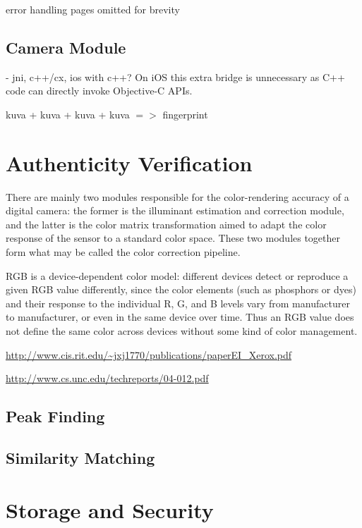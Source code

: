 \documentclass[thesis.tex]{subfiles}
\begin{document}
error handling pages omitted for brevity

\subsection{Camera Module}
- jni, c++/cx, ios with c++?
 On iOS this extra bridge is unnecessary as C++ code can directly invoke Objective-C APIs.

kuva + kuva + kuva + kuva $=>$ fingerprint

\section{Authenticity Verification}

\begin{comment}
\subsection{Color calibration}
\end{comment}
There are mainly two modules responsible for the color-rendering accuracy of a digital camera: the former is the illuminant estimation and correction module, and the latter is the color matrix transformation aimed to adapt the color response of the sensor to a standard color space. These two modules together form what may be called the color correction pipeline.

RGB is a device-dependent color model: different devices detect or reproduce a given RGB value differently, since the color elements (such as phosphors or dyes) and their response to the individual R, G, and B levels vary from manufacturer to manufacturer, or even in the same device over time. Thus an RGB value does not define the same color across devices without some kind of color management.

\url{http://www.cis.rit.edu/~jxj1770/publications/paperEI_Xerox.pdf}

\url{http://www.cs.unc.edu/techreports/04-012.pdf}

\subsection{Peak Finding}

\subsection{Similarity Matching}

\section{Storage and Security}
\end{document}
